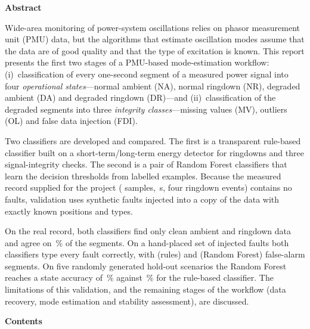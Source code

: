 \documentclass[12pt,letterpaper]{article}
\begin{document}
\begin{center}{\large\bfseries Abstract}\end{center}
\vspace{-0.5ex}
\noindent
Wide-area monitoring of power-system oscillations relies on phasor measurement unit (PMU) data, but the algorithms that estimate oscillation modes assume that the data are of good quality and that the type of excitation is known. This report presents the first two stages of a PMU-based mode-estimation workflow: (i)~classification of every one-second segment of a measured power signal into four \emph{operational states}---normal ambient (NA), normal ringdown (NR), degraded ambient (DA) and degraded ringdown (DR)---and (ii)~classification of the degraded segments into three \emph{integrity classes}---missing values (MV), outliers (OL) and false data injection (FDI).

Two classifiers are developed and compared. The first is a transparent rule-based classifier built on a short-term/long-term energy detector for ringdowns and three signal-integrity checks. The second is a pair of Random Forest classifiers that learn the decision thresholds from labelled examples. Because the measured record supplied for the project (\Nsamples{} samples, \Tdur{}\,s, four ringdown events) contains no faults, validation uses synthetic faults injected into a copy of the data with exactly known positions and types.

On the real record, both classifiers find only clean ambient and ringdown data and agree on \realAgree\,\% of the \Nseg{} segments. On a hand-placed set of \hpEvents{} injected faults both classifiers type every fault correctly, with \hpFAru{} (rules) and \hpFArf{} (Random Forest) false-alarm segments. On five randomly generated hold-out scenarios the Random Forest reaches a state accuracy of \hoRfAcc\,\% against \hoRuAcc\,\% for the rule-based classifier. The limitations of this validation, and the remaining stages of the workflow (data recovery, mode estimation and stability assessment), are discussed.

\clearpage
\begin{center}{\large\bfseries Contents}\end{center}
\vspace{2ex}
{\renewcommand{\contentsname}{}\setlength{\cftbeforetoctitleskip}{0pt}\setlength{\cftaftertoctitleskip}{0pt}\tableofcontents}
\clearpage
{}
\setcounter{page}{1}
\end{document}
